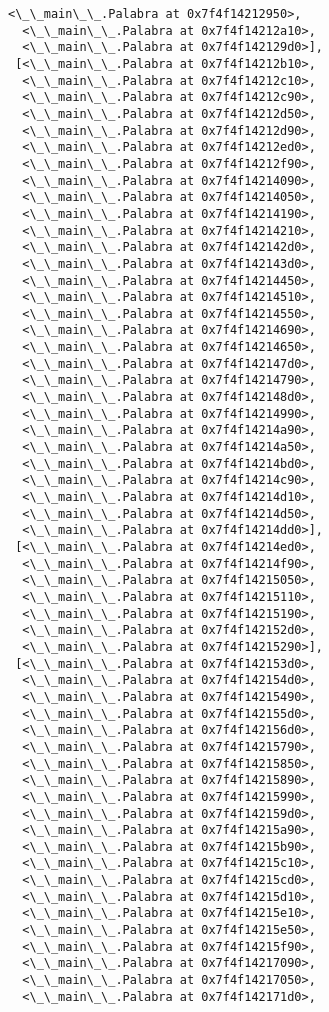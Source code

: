 \documentclass[12pt,a4paper,table]{article}
\begin{document}
\begin{tcolorbox}[breakable, size=fbox, boxrule=.5pt, pad at break*=1mm, opacityfill=0]
\begin{Verbatim}[commandchars=\\\{\}]
  <\_\_main\_\_.Palabra at 0x7f4f14212950>,
  <\_\_main\_\_.Palabra at 0x7f4f14212a10>,
  <\_\_main\_\_.Palabra at 0x7f4f142129d0>],
 [<\_\_main\_\_.Palabra at 0x7f4f14212b10>,
  <\_\_main\_\_.Palabra at 0x7f4f14212c10>,
  <\_\_main\_\_.Palabra at 0x7f4f14212c90>,
  <\_\_main\_\_.Palabra at 0x7f4f14212d50>,
  <\_\_main\_\_.Palabra at 0x7f4f14212d90>,
  <\_\_main\_\_.Palabra at 0x7f4f14212ed0>,
  <\_\_main\_\_.Palabra at 0x7f4f14212f90>,
  <\_\_main\_\_.Palabra at 0x7f4f14214090>,
  <\_\_main\_\_.Palabra at 0x7f4f14214050>,
  <\_\_main\_\_.Palabra at 0x7f4f14214190>,
  <\_\_main\_\_.Palabra at 0x7f4f14214210>,
  <\_\_main\_\_.Palabra at 0x7f4f142142d0>,
  <\_\_main\_\_.Palabra at 0x7f4f142143d0>,
  <\_\_main\_\_.Palabra at 0x7f4f14214450>,
  <\_\_main\_\_.Palabra at 0x7f4f14214510>,
  <\_\_main\_\_.Palabra at 0x7f4f14214550>,
  <\_\_main\_\_.Palabra at 0x7f4f14214690>,
  <\_\_main\_\_.Palabra at 0x7f4f14214650>,
  <\_\_main\_\_.Palabra at 0x7f4f142147d0>,
  <\_\_main\_\_.Palabra at 0x7f4f14214790>,
  <\_\_main\_\_.Palabra at 0x7f4f142148d0>,
  <\_\_main\_\_.Palabra at 0x7f4f14214990>,
  <\_\_main\_\_.Palabra at 0x7f4f14214a90>,
  <\_\_main\_\_.Palabra at 0x7f4f14214a50>,
  <\_\_main\_\_.Palabra at 0x7f4f14214bd0>,
  <\_\_main\_\_.Palabra at 0x7f4f14214c90>,
  <\_\_main\_\_.Palabra at 0x7f4f14214d10>,
  <\_\_main\_\_.Palabra at 0x7f4f14214d50>,
  <\_\_main\_\_.Palabra at 0x7f4f14214dd0>],
 [<\_\_main\_\_.Palabra at 0x7f4f14214ed0>,
  <\_\_main\_\_.Palabra at 0x7f4f14214f90>,
  <\_\_main\_\_.Palabra at 0x7f4f14215050>,
  <\_\_main\_\_.Palabra at 0x7f4f14215110>,
  <\_\_main\_\_.Palabra at 0x7f4f14215190>,
  <\_\_main\_\_.Palabra at 0x7f4f142152d0>,
  <\_\_main\_\_.Palabra at 0x7f4f14215290>],
 [<\_\_main\_\_.Palabra at 0x7f4f142153d0>,
  <\_\_main\_\_.Palabra at 0x7f4f142154d0>,
  <\_\_main\_\_.Palabra at 0x7f4f14215490>,
  <\_\_main\_\_.Palabra at 0x7f4f142155d0>,
  <\_\_main\_\_.Palabra at 0x7f4f142156d0>,
  <\_\_main\_\_.Palabra at 0x7f4f14215790>,
  <\_\_main\_\_.Palabra at 0x7f4f14215850>,
  <\_\_main\_\_.Palabra at 0x7f4f14215890>,
  <\_\_main\_\_.Palabra at 0x7f4f14215990>,
  <\_\_main\_\_.Palabra at 0x7f4f142159d0>,
  <\_\_main\_\_.Palabra at 0x7f4f14215a90>,
  <\_\_main\_\_.Palabra at 0x7f4f14215b90>,
  <\_\_main\_\_.Palabra at 0x7f4f14215c10>,
  <\_\_main\_\_.Palabra at 0x7f4f14215cd0>,
  <\_\_main\_\_.Palabra at 0x7f4f14215d10>,
  <\_\_main\_\_.Palabra at 0x7f4f14215e10>,
  <\_\_main\_\_.Palabra at 0x7f4f14215e50>,
  <\_\_main\_\_.Palabra at 0x7f4f14215f90>,
  <\_\_main\_\_.Palabra at 0x7f4f14217090>,
  <\_\_main\_\_.Palabra at 0x7f4f14217050>,
  <\_\_main\_\_.Palabra at 0x7f4f142171d0>,

\end{Verbatim}
\end{tcolorbox}
\end{document}
